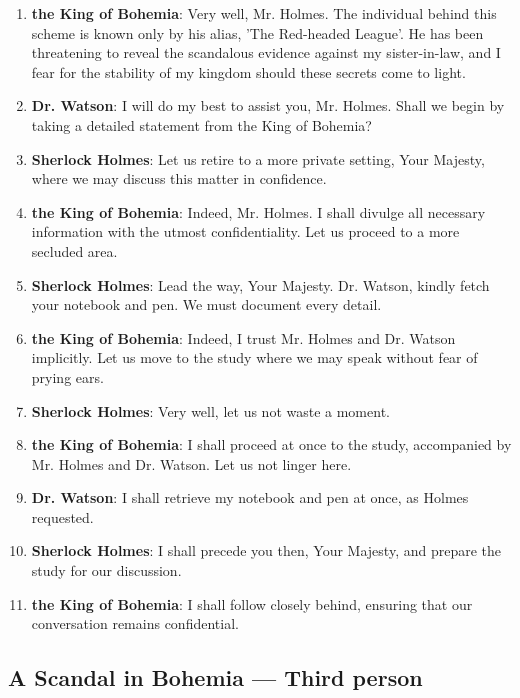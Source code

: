 \documentclass[10pt]{article}
\begin{document}
\begin{enumerate}
\item \textbf{the King of Bohemia}: Very well, Mr. Holmes. The individual behind this scheme is known only by his alias, 'The Red-headed League'. He has been threatening to reveal the scandalous evidence against my sister-in-law, and I fear for the stability of my kingdom should these secrets come to light.

\item \textbf{Dr. Watson}: I will do my best to assist you, Mr. Holmes. Shall we begin by taking a detailed statement from the King of Bohemia?

\item \textbf{Sherlock Holmes}: Let us retire to a more private setting, Your Majesty, where we may discuss this matter in confidence.

\item \textbf{the King of Bohemia}: Indeed, Mr. Holmes. I shall divulge all necessary information with the utmost confidentiality. Let us proceed to a more secluded area.

\item \textbf{Sherlock Holmes}: Lead the way, Your Majesty. Dr. Watson, kindly fetch your notebook and pen. We must document every detail.

\item \textbf{the King of Bohemia}: Indeed, I trust Mr. Holmes and Dr. Watson implicitly. Let us move to the study where we may speak without fear of prying ears.

\item \textbf{Sherlock Holmes}: Very well, let us not waste a moment.

\item \textbf{the King of Bohemia}: I shall proceed at once to the study, accompanied by Mr. Holmes and Dr. Watson. Let us not linger here.

\item \textbf{Dr. Watson}: I shall retrieve my notebook and pen at once, as Holmes requested.

\item \textbf{Sherlock Holmes}: I shall precede you then, Your Majesty, and prepare the study for our discussion.

\item \textbf{the King of Bohemia}: I shall follow closely behind, ensuring that our conversation remains confidential.

\end{enumerate}

\subsection*{A Scandal in Bohemia --- Third person}
\end{document}
